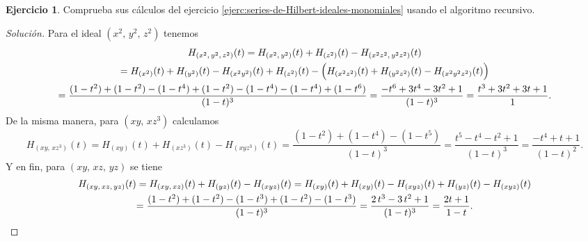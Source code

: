 \documentclass{article}
\theoremstyle{definition}
\newtheorem{ejerc}{Ejercicio}
\newenvironment{solucion}{\begin{proof}[Solución]}{\end{proof}}
\begin{document}
\begin{ejerc}
  Comprueba sus cálculos del ejercicio
  \ref{ejerc:series-de-Hilbert-ideales-monomiales} usando el algoritmo
  recursivo.

  \ifdefined\solutions\begin{solucion}
    Para el ideal $(x^2, \, y^2, \, z^2)$ tenemos
    \begin{multline*}
      H_{(x^2, \, y^2, \, z^2)} (t) =
      H_{(x^2, \, y^2)} (t) + H_{(z^2)} (t) - H_{(x^2 z^2, \, y^2 z^2)} (t) \\
      = H_{(x^2)} (t) + H_{(y^2)} (t) -  H_{(x^2 y^2)} (t) + H_{(z^2)} (t) -
        \Bigl(H_{(x^2 z^2)} (t) + H_{(y^2 z^2)} (t) - H_{(x^2 y^2 z^2)} (t) \Bigr) \\
      = \frac{(1-t^2)+(1-t^2)-(1-t^4)+(1-t^2)-(1-t^4)-(1-t^4)+(1-t^6)}{(1-t)^3} =
        \frac{-t^6 + 3t^4 - 3t^2 + 1}{(1-t)^3} = \frac{t^3 + 3t^2 + 3t + 1}{1}.
    \end{multline*}
    De la misma manera, para $(xy, \, xz^3)$ calculamos
    \[ H_{(xy, \, xz^3)} (t) =
       H_{(xy)} (t) + H_{(xz^3)} (t) - H_{(xyz^3)} (t) =
       \frac{(1-t^2) + (1-t^4) - (1-t^5)}{(1-t)^3} =
       \frac{t^5 - t^4 - t^2 + 1}{(1-t)^3} =
       \frac{-t^4 + t + 1}{(1-t)^2}. \]
    Y en fin, para $(xy, \, xz, \, yz)$ se tiene
    \begin{multline*}
      H_{(xy, \, xz, \, yz)} (t) =
      H_{(xy, \, xz)} (t) + H_{(yz)} (t) - H_{(xyz)} (t) =
      H_{(xy)} (t) + H_{(xy)} (t) - H_{(xyz)} (t) + H_{(yz)} (t) - H_{(xyz)} (t) \\
    = \frac{(1-t^2) + (1-t^2) - (1-t^3) + (1-t^2) - (1-t^3)}{(1-t)^3} =
      \frac{2\,t^3 - 3\,t^2 + 1}{(1-t)^3} =
      \frac{2t + 1}{1-t}. \qedhere
    \end{multline*}
  \end{solucion}\fi
\end{ejerc}
\end{document}

